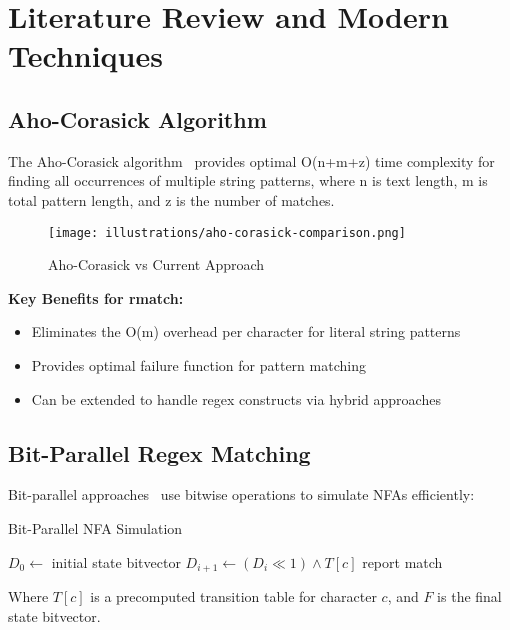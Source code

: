 \documentclass[11pt,a4paper]{article}
\begin{document}
\section{Literature Review and Modern Techniques}

\subsection{Aho-Corasick Algorithm}

The Aho-Corasick algorithm~\cite{aho1975efficient} provides optimal O(n+m+z) time complexity for finding all occurrences of multiple string patterns, where n is text length, m is total pattern length, and z is the number of matches.

\begin{figure}[htbp]
\centering
\texttt{[image: illustrations/aho-corasick-comparison.png]}
\caption{Aho-Corasick vs Current Approach}
\label{fig:aho-corasick}
\end{figure}

\textbf{Key Benefits for rmatch:}
\begin{itemize}
\item Eliminates the O(m) overhead per character for literal string patterns
\item Provides optimal failure function for pattern matching
\item Can be extended to handle regex constructs via hybrid approaches
\end{itemize}

\subsection{Bit-Parallel Regex Matching}

Bit-parallel approaches~\cite{baeza1992new,myers1999fast} use bitwise operations to simulate NFAs efficiently:

\begin{algorithm}
\caption{Bit-Parallel NFA Simulation}
\begin{algorithmic}[1]
\STATE $D_0 \gets$ initial state bitvector
    \STATE $D_{i+1} \gets (D_i \ll 1) \land T[c]$
        \STATE report match
    \ENDIF
\ENDFOR
\end{algorithmic}
\end{algorithm}

Where $T[c]$ is a precomputed transition table for character $c$, and $F$ is the final state bitvector.
\end{document}
